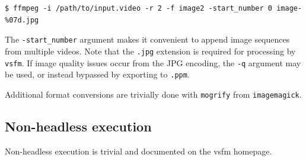 \documentclass{article}
\begin{document}
\begin{lstlisting}
$ ffmpeg -i /path/to/input.video -r 2 -f image2 -start_number 0 image-%07d.jpg
\end{lstlisting}

The {\tt -start\_number} argument makes it convenient to append image sequences from multiple videos. Note that the {\tt .jpg} extension is required for processing by {\tt vsfm}. If image quality issues occur from the JPG encoding, the {\tt -q} argument may be used, or instead bypassed by exporting to {\tt .ppm}.

Additional format conversions are trivially done with {\tt mogrify} from {\tt imagemagick}.

\subsection{Non-headless execution}

Non-headless execution is trivial and documented on the vsfm homepage.
\end{document}
